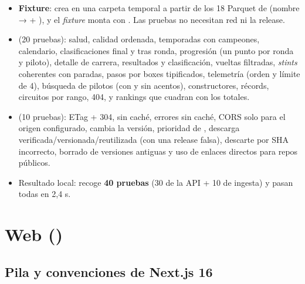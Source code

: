 \begin{itemize}
\item \textbf{Fixture}:  crea en una carpeta temporal  a partir de los 18 Parquet de  (nombre  →  + ), y el \emph{fixture}  monta  con . Las pruebas no necesitan red ni la release.
\item {} (20 pruebas): salud, calidad ordenada, temporadas con campeones, calendario, clasificaciones final y tras ronda, progresión (un punto por ronda y piloto), detalle de carrera, resultados y clasificación, vueltas filtradas, \emph{stints} coherentes con paradas, pasos por boxes tipificados, telemetría (orden y límite de 4), búsqueda de pilotos (con y sin acentos), constructores, récords, circuitos por rango, 404, y rankings que cuadran con los totales.
\item {} (10 pruebas): ETag + 304,  sin caché, errores sin caché, CORS solo para el origen configurado,  cambia la versión, prioridad de , descarga verificada/versionada/reutilizada (con una release falsa), descarte por SHA incorrecto, borrado de versiones antiguas y uso de enlaces directos para repos públicos.
\item Resultado local:  recoge \textbf{40 pruebas} (30 de la API + 10 de ingesta) y pasan todas en 2,4 s.
\end{itemize}

\section{Web ()}

\subsection{Pila y convenciones de Next.js 16}

